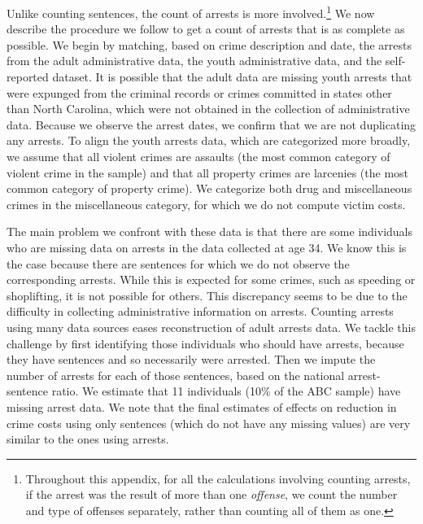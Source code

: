 \noindent Unlike counting sentences, the count of arrests is more involved.\footnote{Throughout this appendix, for all the calculations involving counting arrests, if the arrest was the result of more than one \textit{offense}, we count the number and type of offenses separately, rather than counting all of them as one.} We now describe the procedure we follow to get a count of arrests that is as complete as possible. We begin by matching, based on crime description and date, the arrests from the adult administrative data, the youth administrative data, and the self-reported dataset. It is possible that the adult data are missing youth arrests that were expunged from the criminal records or crimes committed in states other than North Carolina, which were not obtained in the collection of administrative data. Because we observe the arrest dates, we confirm that we are not duplicating any arrests. To align the youth arrests data, which are categorized more broadly, we assume that all violent crimes are assaults (the most common category of violent crime in the sample) and that all property crimes are larcenies (the most common category of property crime). We categorize both drug and miscellaneous crimes in the miscellaneous category, for which we do not compute victim costs.

\noindent The main problem we confront with these data is that there are some individuals who are missing data on arrests in the data collected at age 34. We know this is the case because there are sentences for which we do not observe the corresponding arrests. While this is expected for some crimes, such as speeding or shoplifting, it is not possible for others. This discrepancy seems to be due to the difficulty in collecting administrative information on arrests. Counting arrests using many data sources eases  reconstruction of adult arrests data. We tackle this challenge by first identifying those individuals who should have arrests, because they have sentences and so necessarily were arrested. Then we impute the number of arrests for each of those sentences, based on the national arrest-sentence ratio. We estimate that 11 individuals (10\% of the ABC sample) have missing arrest data. We note that the final estimates of effects on reduction in crime costs using only sentences (which do not have any missing values) are very similar to the ones using arrests.

